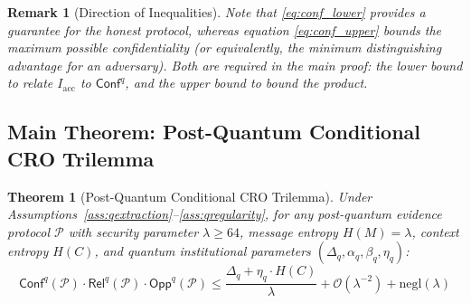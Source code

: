 \documentclass{ieeeaccess}
\newcommand{\Conf}{\mathsf{Conf}}
\newcommand{\Rel}{\mathsf{Rel}}
\newcommand{\Opp}{\mathsf{Opp}}
\newtheorem{theorem}{Theorem}[section]
\newtheorem{remark}{Remark}[section]
\begin{document}
\begin{remark}[Direction of Inequalities]
Note that \eqref{eq:conf_lower} provides a guarantee for the honest protocol, whereas equation \eqref{eq:conf_upper} bounds the maximum possible confidentiality (or equivalently, the minimum distinguishing advantage for an adversary). Both are required in the main proof: the lower bound to relate $I_{\mathrm{acc}}$ to $\Conf^q$, and the upper bound to bound the product.
\end{remark}


\subsection{Main Theorem: Post-Quantum Conditional CRO Trilemma}

\begin{theorem}[Post-Quantum Conditional CRO Trilemma]
\label{thm:pq_cro}
Under Assumptions~\ref{ass:qextraction}--\ref{ass:qregularity}, for any post-quantum evidence protocol $\mathcal{P}$ with security parameter $\lambda \geq 64$, message entropy $H(M) = \lambda$, context entropy $H(C)$, and quantum institutional parameters $(\Delta_q, \alpha_q, \beta_q, \eta_q)$:
\begin{equation}
    \Conf^q(\mathcal{P}) \cdot \Rel^q(\mathcal{P}) \cdot \Opp^q(\mathcal{P}) \leq \frac{\Delta_q + \eta_q \cdot H(C)}{\lambda} + \mathcal{O}(\lambda^{-2}) + \text{negl}(\lambda)
\end{equation}
\end{theorem}
\end{document}
